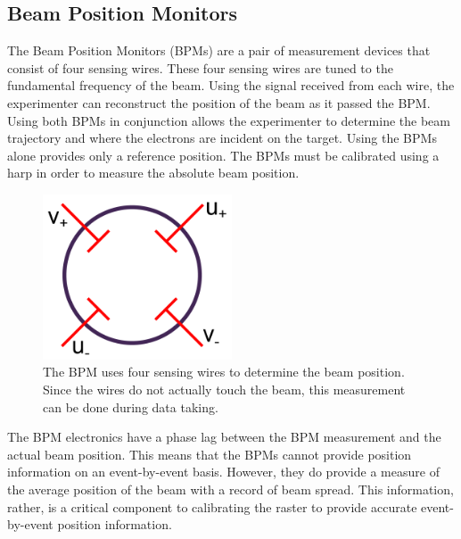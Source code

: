 \subsection{Beam Position Monitors}

The Beam Position Monitors (BPMs) are a pair of measurement devices that consist of four sensing wires. These four sensing wires are tuned to the fundamental frequency of the beam. Using the signal received from each wire, the experimenter can reconstruct the position of the beam as it passed the BPM. Using both BPMs in conjunction allows the experimenter to determine the beam trajectory and where the electrons are incident on the target. Using the BPMs alone provides only a reference position. The BPMs must be calibrated using a harp in order to measure the absolute beam position.

\begin{figure}[h]
\begin{center}
	\includegraphics[width=0.5\textwidth]{./setup/fig/bpm.png}
	\caption{The BPM uses four sensing wires to determine the beam position. Since the wires do not actually touch the beam, this measurement can be done during data taking.\cite{harp_schem}}
\end{center}
\end{figure}

The BPM electronics have a phase lag between the BPM measurement and the actual beam position. This means that the BPMs cannot provide position information on an event-by-event basis. However, they do provide a measure of the average position of the beam with a record of beam spread. This information, rather, is a critical component to calibrating the raster to provide accurate event-by-event position information.
